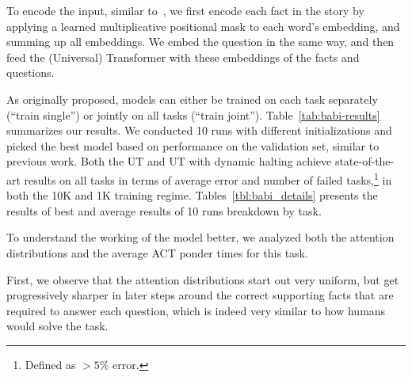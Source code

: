


To encode the input, similar to~\cite{henaff2016tracking}, we first encode each fact in the story by applying a learned multiplicative positional mask to each word's embedding, and summing up all embeddings.
We embed the question in the same way, and then feed the (Universal) Transformer with these embeddings of the facts and questions. 

As originally proposed, models can either be trained on each task separately (``train single'') or jointly on all tasks (``train joint''). Table~\ref{tab:babi-results} summarizes our results. We conducted 10 runs with different initializations and picked the best model based on performance on the validation set, similar to previous work. Both the UT and UT with dynamic halting achieve state-of-the-art results on all tasks in terms of average error and number of failed tasks,\footnote{Defined as $> 5\%$ error.} in both the 10K and 1K training regime. Tables~\ref{tbl:babi_details} presents the results of best and average results of 10 runs breakdown by task.

To understand the working of the model better, we analyzed both the attention distributions and the average ACT ponder times for this task. 

First, we observe that the attention distributions start out very uniform, but get progressively sharper in later steps around the correct supporting facts that are required to answer each question, which is indeed very similar to how humans would solve the task. 

